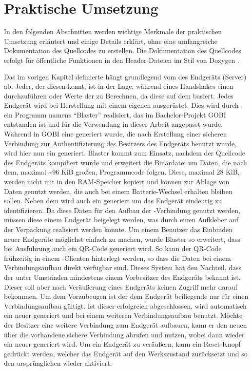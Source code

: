 \chapter{Praktische Umsetzung}

In den folgenden Abschnitten werden wichtige Merkmale der praktischen Umsetzung erläutert und einige Details erklärt,
ohne eine umfangreiche Dokumentation des Quellcodes zu erstellen. Die Dokumentation des Quellcodes erfolgt für öffentliche
Funktionen in den Header-Dateien im Stil von Doxygen \cite{doxygen}.

Das im vorigen Kapitel definierte  hängt grundlegend vom  des Endgeräts (Server) ab. Jeder, der diesen kennt, ist in
der Lage, während eines Handshakes einen  durchzuführen oder Werte der  zu Berechnen, da diese auf dem  basiert.
Jedes Endgerät wird bei Herstellung mit einem eigenen  ausgerüstet. Dies wird durch ein Programm namens "`Blaster"' realisiert, das
im Bachelor-Projekt GOBI entstanden ist und für die Verwendung in dieser Arbeit angepasst wurde. Während in GOBI eine  generiert wurde,
die nach Erstellung einer sicheren Verbindung zur Authentifizierung des Besitzers des Endgeräts benutzt wurde, wird hier nun ein 
generiert. Blaster kommt zum Einsatz, nachdem der Quellcode des Endgeräts kompiliert wurde und erweitert die Binärdatei um Daten, die nach dem,
maximal \textasciitilde 96 KiB großen, Programmcode folgen. Diese, maximal 28 KiB, werden nicht mit in den RAM-Speicher kopiert und können zur
Ablage von Daten genutzt werden, die auch bei einem Batterie-Wechsel erhalten bleiben sollen. Neben dem  wird auch ein 
generiert um das Endgerät eindeutig zu identifizieren. Da diese Daten für den Aufbau der -Verbindung genutzt werden, müssen diese
einem Endgerät beigelegt werden, was durch einen Aufkleber auf der Verpackung realisiert werden könnte. Um einem Benutzer das Einbinden neuer
Endgeräte möglichst einfach zu machen, wurde Blaster so erweitert, dass bei Ausführung auch ein QR-Code generiert wird. So kann der QR-Code
frühzeitig in einem -Clienten hinterlegt werden, so dass die Daten bei einem Verbindungsaufbau direkt verfügbar sind. Dieses System hat
den Nachteil, dass der  unter Umständen mindestens einem Vorbesitzer des Endgeräts bekannt ist. Dieser soll aber nach Veräußerung eines
Endgeräts keinen Zugriff mehr darauf bekommen. Um dem Vorzubeugen ist der dem Endgerät beiliegende  nur für einen Verbindungsaufbau
gültigt. Ist dieser erfolgreich abgeschlossen, wird automatisch ein neuer  generiert und bei einem weiteren Verbindungsaufbau benutzt.
Möchte der Besitzer eine weitere Verbindung zum Endgerät aufbauen, kann er den neuen  über die vorhandene sichere Verbindung abrufen
und nutzen, wobei dann wieder ein neuer  generiert wird. Um ein Endgerät zu veräußern, kann ein Reset-Knopf gedrückt werden, welcher das
Endgerät auf den Werkszustand zurücksetzt und so den ursprünglichen  wieder aktiviert.




